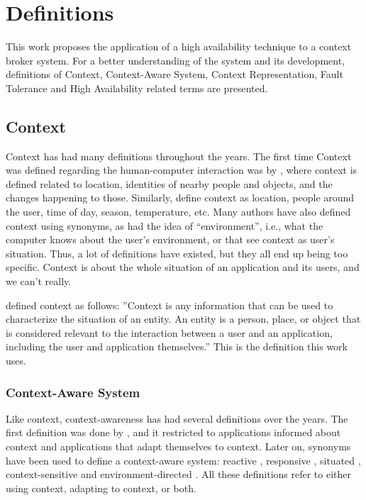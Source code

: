 \chapter{Definitions}
This work proposes the application of a high availability technique to a context broker system. For a better understanding of the system and its development, definitions of Context, Context-Aware System, Context Representation, Fault Tolerance and High Availability related terms are presented.

\section{Context}
Context has had many definitions throughout the years. The first time Context was defined regarding the human-computer interaction was by \cite{schilit1994disseminating}, where context is defined related to location, identities of nearby people and objects, and the changes happening to those.  Similarly, \cite{brown1997context} define context as location, people around the user, time of day, season, temperature, etc. Many authors have also defined context using synonyms, as \cite{brown1995stick} had the idea of “environment”, i.e., what the computer knows about the user's environment, or \cite{franklin1998all} that see context as user's situation. Thus, a lot of definitions have existed, but they all end up being too specific. Context is about the whole situation of an application and its users, and we can't really.

\cite{dey2000providing} defined context as follows: ''Context is any information that can be used to characterize the situation of an entity. An entity is a person, place, or object that is considered relevant to the interaction between a user and an application, including the user and application themselves.'' This is the definition this work uses.

\subsection{Context-Aware System}
Like context, context-awareness has had several definitions over the years. The first definition was done by \cite{schilit1994disseminating}, and it restricted to applications informed about context and applications that adapt themselves to context. Later on, synonyms have been used to define a context-aware system: reactive \cite{cooperstock1995evolution}, responsive \cite{elrod1993responsive}, situated \cite{hull1997towards}, context-sensitive  \cite{rekimoto1998augment} and environment-directed \cite{fickas1997software}. All these definitions refer to either using context, adapting to context, or both.

